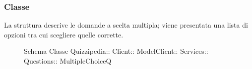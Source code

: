 \subsubsection{Classe }
La struttura descrive le domande a scelta multipla; viene presentata una lista di opzioni tra cui scegliere quelle corrette.
\begin{figure}[H]
\centering
\noindent{}
\caption[Schema Classe MultipleChoiceQ]{Schema Classe Quizzipedia:: Client:: ModelClient:: Services:: Questions:: MultipleChoiceQ}
\end{figure}
